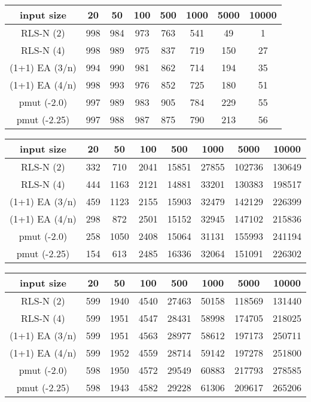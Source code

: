 \begin{tabular}[h]{cccccccc}
      input size     & 20  & 50  & 100 & 500 & 1000 & 5000 & 10000 \\\hline
      RLS-N (2)      & 998 & 984 & 973 & 763 & 541  & 49   & 1     \\
      RLS-N (4)      & 998 & 989 & 975 & 837 & 719  & 150  & 27    \\
      (1+1) EA (3/n) & 994 & 990 & 981 & 862 & 714  & 194  & 35    \\
      (1+1) EA (4/n) & 998 & 993 & 976 & 852 & 725  & 180  & 51    \\
      pmut (-2.0)    & 997 & 989 & 983 & 905 & 784  & 229  & 55    \\
      pmut (-2.25)   & 997 & 988 & 987 & 875 & 790  & 213  & 56    \\
\end{tabular}

\begin{tabular}[h]{cccccccc}
      input size     & 20  & 50   & 100  & 500   & 1000  & 5000   & 10000  \\\hline
      RLS-N (2)      & 332 & 710  & 2041 & 15851 & 27855 & 102736 & 130649 \\
      RLS-N (4)      & 444 & 1163 & 2121 & 14881 & 33201 & 130383 & 198517 \\
      (1+1) EA (3/n) & 459 & 1123 & 2155 & 15903 & 32479 & 142129 & 226399 \\
      (1+1) EA (4/n) & 298 & 872  & 2501 & 15152 & 32945 & 147102 & 215836 \\
      pmut (-2.0)    & 258 & 1050 & 2408 & 15064 & 31131 & 155993 & 241194 \\
      pmut (-2.25)   & 154 & 613  & 2485 & 16336 & 32064 & 151091 & 226302 \\
\end{tabular}

\begin{tabular}[h]{cccccccc}
      input size     & 20  & 50   & 100  & 500   & 1000  & 5000   & 10000  \\\hline
      RLS-N (2)      & 599 & 1940 & 4540 & 27463 & 50158 & 118569 & 131440 \\
      RLS-N (4)      & 599 & 1951 & 4547 & 28431 & 58998 & 174705 & 218025 \\
      (1+1) EA (3/n) & 599 & 1951 & 4563 & 28977 & 58612 & 197173 & 250711 \\
      (1+1) EA (4/n) & 599 & 1952 & 4559 & 28714 & 59142 & 197278 & 251800 \\
      pmut (-2.0)    & 598 & 1950 & 4572 & 29549 & 60883 & 217793 & 278585 \\
      pmut (-2.25)   & 598 & 1943 & 4582 & 29228 & 61306 & 209617 & 265206 \\
\end{tabular}